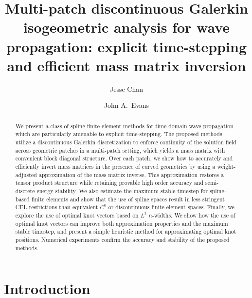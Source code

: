 \documentclass[preprint,10pt]{elsarticle}
\date{}
\begin{document}
\begin{frontmatter}
\author[rice]{Jesse Chan}
\author[vt]{John A.\ Evans}
\address[rice]{Department of Computational and Applied Mathematics, Rice University, 6100 Main St, Houston, TX, 77005}
\address[vt]{Ann and H.J. Smead Aerospace Engineering Sciences, University of Colorado Boulder, 429 UCB, Boulder, Colorado, 80309}

\title{Multi-patch discontinuous Galerkin isogeometric analysis for wave propagation: explicit time-stepping and efficient mass matrix inversion}

\begin{abstract}
We present a class of spline finite element methods for time-domain wave propagation which are particularly amenable to explicit time-stepping.  The proposed methods utilize a discontinuous Galerkin discretization to enforce continuity of the solution field across geometric patches in a multi-patch setting, which yields a mass matrix with convenient block diagonal structure.  Over each patch, we show how to accurately and efficiently invert mass matrices in the presence of curved geometries by using a weight-adjusted approximation of the mass matrix inverse.  This approximation restores a tensor product structure while retaining provable high order accuracy and semi-discrete energy stability.  We also estimate the maximum stable timestep for spline-based finite elements and show that the use of spline spaces result in less stringent CFL restrictions than equivalent $C^0$ or discontinuous finite element spaces.  Finally, we explore the use of optimal knot vectors based on $L^2$ $n$-widths.  We show how the use of optimal knot vectors can improve both approximation properties and the maximum stable timestep, and present a simple heuristic method for approximating optimal knot positions.  Numerical experiments confirm the accuracy and stability of the proposed methods.  
\end{abstract}
\end{frontmatter}
\section{Introduction}
\end{document}
